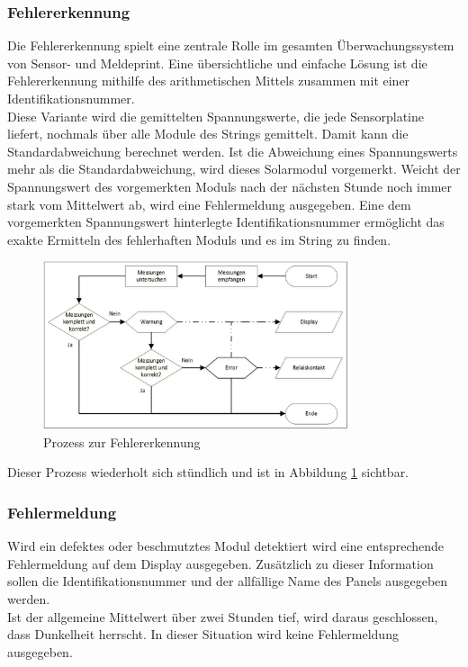 \subsubsection{Fehlererkennung}
Die Fehlererkennung spielt eine zentrale Rolle im gesamten Überwachungssystem von Sensor- und Meldeprint. Eine übersichtliche und einfache Lösung ist die Fehlererkennung mithilfe des arithmetischen Mittels zusammen mit einer Identifikationsnummer.\\
Diese Variante wird die gemittelten Spannungswerte, die jede Sensorplatine liefert, nochmals über alle Module des Strings gemittelt. Damit kann die Standardabweichung berechnet werden. Ist die Abweichung eines Spannungswerts mehr als die Standardabweichung, wird dieses Solarmodul vorgemerkt. Weicht der Spannungswert des vorgemerkten Moduls nach der nächsten Stunde noch immer stark vom Mittelwert ab, wird eine Fehlermeldung ausgegeben. Eine dem vorgemerkten Spannungswert hinterlegte Identifikationsnummer ermöglicht das exakte Ermitteln des fehlerhaften Moduls und es im String zu finden.
\begin{figure}[htbp] 
  \centering
     \includegraphics[width=0.8\textwidth]{graphics/error-warning-scheme}
  \caption{Prozess zur Fehlererkennung}
  \label{fig:error-warning-scheme}
\end{figure}
Dieser Prozess wiederholt sich stündlich und ist in Abbildung \ref{fig:error-warning-scheme} sichtbar.
\subsubsection{Fehlermeldung}
Wird ein defektes oder beschmutztes Modul detektiert wird eine entsprechende Fehlermeldung auf dem Display ausgegeben. Zusätzlich zu dieser Information sollen die Identifikationsnummer und der allfällige Name des Panels ausgegeben werden.\\
Ist der allgemeine Mittelwert über zwei Stunden tief, wird daraus geschlossen, dass Dunkelheit herrscht. In dieser Situation wird keine Fehlermeldung ausgegeben.
